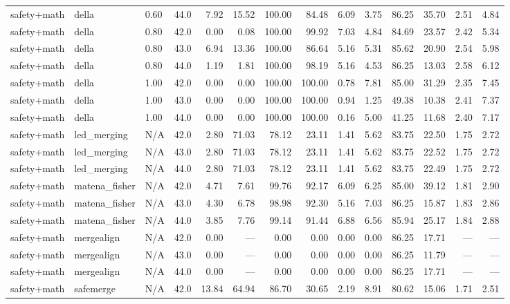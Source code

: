 \documentclass{article}
\begin{document}
\begin{table}[H]
{\begin{tabular}{llllrrrrrrrrrr}
safety+math & della & 0.60 & 44.0 & 7.92 & 15.52 & 100.00 & 84.48 & 6.09 & 3.75 & 86.25 & 35.70 & 2.51 & 4.84 \\
safety+math & della & 0.80 & 42.0 & 0.00 & 0.08 & 100.00 & 99.92 & 7.03 & 4.84 & 84.69 & 23.57 & 2.42 & 5.34 \\
safety+math & della & 0.80 & 43.0 & 6.94 & 13.36 & 100.00 & 86.64 & 5.16 & 5.31 & 85.62 & 20.90 & 2.54 & 5.98 \\
safety+math & della & 0.80 & 44.0 & 1.19 & 1.81 & 100.00 & 98.19 & 5.16 & 4.53 & 86.25 & 13.03 & 2.58 & 6.12 \\
safety+math & della & 1.00 & 42.0 & 0.00 & 0.00 & 100.00 & 100.00 & 0.78 & 7.81 & 85.00 & 31.29 & 2.35 & 7.45 \\
safety+math & della & 1.00 & 43.0 & 0.00 & 0.00 & 100.00 & 100.00 & 0.94 & 1.25 & 49.38 & 10.38 & 2.41 & 7.37 \\
safety+math & della & 1.00 & 44.0 & 0.00 & 0.00 & 100.00 & 100.00 & 0.16 & 5.00 & 41.25 & 11.68 & 2.40 & 7.17 \\
safety+math & led\_merging & N/A & 42.0 & 2.80 & 71.03 & 78.12 & 23.11 & 1.41 & 5.62 & 83.75 & 22.50 & 1.75 & 2.72 \\
safety+math & led\_merging & N/A & 43.0 & 2.80 & 71.03 & 78.12 & 23.11 & 1.41 & 5.62 & 83.75 & 22.52 & 1.75 & 2.72 \\
safety+math & led\_merging & N/A & 44.0 & 2.80 & 71.03 & 78.12 & 23.11 & 1.41 & 5.62 & 83.75 & 22.49 & 1.75 & 2.72 \\
safety+math & matena\_fisher & N/A & 42.0 & 4.71 & 7.61 & 99.76 & 92.17 & 6.09 & 6.25 & 85.00 & 39.12 & 1.81 & 2.90 \\
safety+math & matena\_fisher & N/A & 43.0 & 4.30 & 6.78 & 98.98 & 92.30 & 5.16 & 7.03 & 86.25 & 15.87 & 1.83 & 2.86 \\
safety+math & matena\_fisher & N/A & 44.0 & 3.85 & 7.76 & 99.14 & 91.44 & 6.88 & 6.56 & 85.94 & 25.17 & 1.84 & 2.88 \\
safety+math & mergealign & N/A & 42.0 & 0.00 & --- & 0.00 & 0.00 & 0.00 & 0.00 & 86.25 & 17.71 & --- & --- \\
safety+math & mergealign & N/A & 43.0 & 0.00 & --- & 0.00 & 0.00 & 0.00 & 0.00 & 86.25 & 11.79 & --- & --- \\
safety+math & mergealign & N/A & 44.0 & 0.00 & --- & 0.00 & 0.00 & 0.00 & 0.00 & 86.25 & 17.71 & --- & --- \\
safety+math & safemerge & N/A & 42.0 & 13.84 & 64.94 & 86.70 & 30.65 & 2.19 & 8.91 & 80.62 & 15.06 & 1.71 & 2.51 \\

\end{tabular}}
\end{table}
\end{document}
